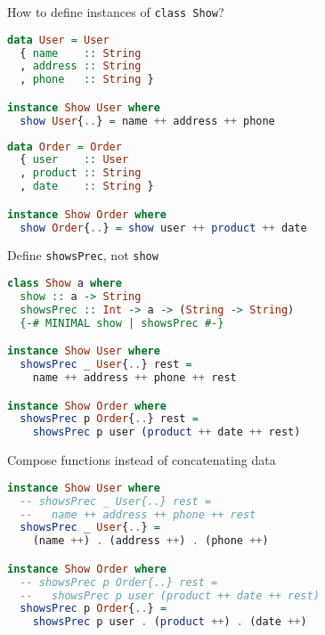 \documentclass[handout]{beamer}
\begin{document}
\begin{frame}[fragile]{How to define instances of {\tt class Show}?}

\begin{lstlisting}[language=Haskell]
data User = User
  { name    :: String
  , address :: String
  , phone   :: String }

instance Show User where
  show User{..} = name ++ address ++ phone
\end{lstlisting}

\pause

\begin{lstlisting}[language=Haskell]
data Order = Order
  { user    :: User
  , product :: String
  , date    :: String }

instance Show Order where
  show Order{..} = show user ++ product ++ date
\end{lstlisting}

\end{frame}

\begin{frame}[fragile]{Define {\tt showsPrec}, not {\tt show}}

\begin{lstlisting}[language=Haskell]
class Show a where
  show :: a -> String
  showsPrec :: Int -> a -> (String -> String)
  {-# MINIMAL show | showsPrec #-}

instance Show User where
  showsPrec _ User{..} rest =
    name ++ address ++ phone ++ rest

instance Show Order where
  showsPrec p Order{..} rest =
    showsPrec p user (product ++ date ++ rest)
\end{lstlisting}

\end{frame}

\begin{frame}[fragile]{Compose functions instead of concatenating data}

\begin{lstlisting}[language=Haskell]
instance Show User where
  -- showsPrec _ User{..} rest =
  --   name ++ address ++ phone ++ rest
  showsPrec _ User{..} =
    (name ++) . (address ++) . (phone ++)

instance Show Order where
  -- showsPrec p Order{..} rest =
  --   showsPrec p user (product ++ date ++ rest)
  showsPrec p Order{..} =
    showsPrec p user . (product ++) . (date ++)
\end{lstlisting}

\end{frame}
\end{document}
